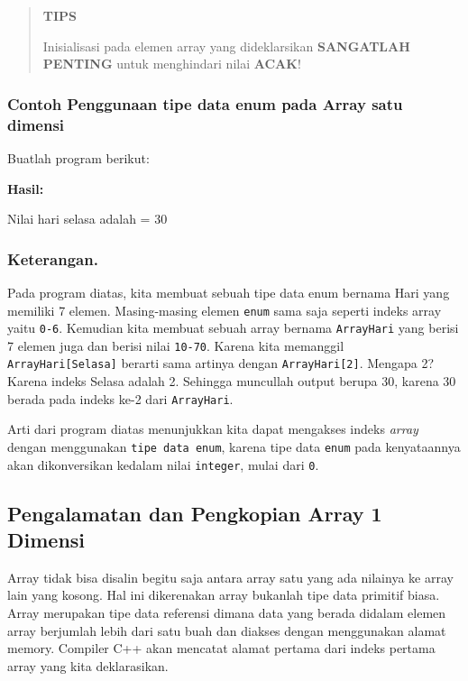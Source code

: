 \begin{quotation}
{\LARGE {}} \textbf{TIPS}

 Inisialisasi pada elemen array yang dideklarsikan \textbf{SANGATLAH
 PENTING} untuk menghindari nilai \textbf{ACAK}!
\end{quotation}


\subsubsection*{Contoh Penggunaan tipe data enum pada Array satu dimensi}

Buatlah program berikut:



\textbf{Hasil:}

\begin{lcverbatim}
Nilai hari selasa adalah = 30
\end{lcverbatim}

\subsubsection*{Keterangan.}

Pada program diatas, kita membuat sebuah tipe data enum bernama Hari
yang memiliki 7 elemen. Masing-masing elemen \texttt{enum} sama saja
seperti indeks array yaitu \texttt{0-6}. Kemudian kita membuat sebuah
array bernama \texttt{ArrayHari} yang berisi 7 elemen juga dan berisi
nilai \texttt{10-70}. Karena kita memanggil \\
\texttt{ArrayHari{[}Selasa{]}} berarti sama artinya dengan
\texttt{ArrayHari{[}2{]}}. Mengapa 2? Karena indeks Selasa adalah 2.
Sehingga muncullah output berupa 30, karena 30 berada pada indeks ke-2
dari \texttt{ArrayHari}.

Arti dari program diatas menunjukkan kita dapat mengakses indeks
\emph{array} dengan menggunakan \texttt{tipe\ data\ enum}, karena tipe
data \texttt{enum} pada kenyataannya akan dikonversikan kedalam nilai
\texttt{integer}, mulai dari \texttt{0}.

\subsection{Pengalamatan dan Pengkopian Array 1 Dimensi}\label{pengalamatan-dan-pengkopian-array-1-dimensi}

Array tidak bisa disalin begitu saja antara array satu yang ada nilainya
ke array lain yang kosong. Hal ini dikerenakan array bukanlah tipe data
primitif biasa. Array merupakan tipe data referensi dimana data yang
berada didalam elemen array berjumlah lebih dari satu buah dan diakses
dengan menggunakan alamat memory. Compiler C++ akan mencatat alamat
pertama dari indeks pertama array yang kita deklarasikan.

